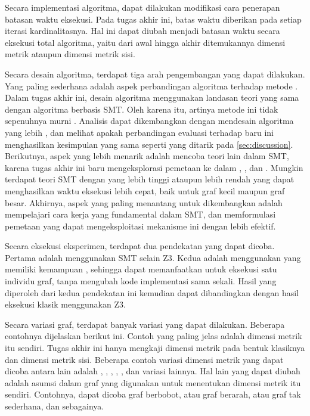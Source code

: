 Secara implementasi algoritma, dapat dilakukan modifikasi cara penerapan batasan waktu eksekusi. Pada tugas akhir ini, batas waktu diberikan pada setiap iterasi kardinalitasnya. Hal ini dapat diubah menjadi batasan waktu secara eksekusi total algoritma, yaitu dari awal hingga akhir ditemukannya dimensi metrik ataupun dimensi metrik sisi.

Secara desain algoritma, terdapat tiga arah pengembangan yang dapat dilakukan. Yang paling sederhana adalah aspek perbandingan algoritma terhadap metode . Dalam tugas akhir ini, desain algoritma  menggunakan landasan teori yang sama dengan algoritma berbasis SMT. Oleh karena itu, artinya metode ini tidak sepenuhnya murni . Analisis dapat dikembangkan dengan mendesain algoritma  yang lebih , dan melihat apakah perbandingan evaluasi terhadap  baru ini menghasilkan kesimpulan yang sama seperti yang ditarik pada \autoref{sec:discussion}. Berikutnya, aspek yang lebih menarik adalah mencoba teori lain dalam SMT, karena tugas akhir ini baru mengeksplorasi pemetaan  ke dalam , , dan . Mungkin terdapat teori SMT dengan  yang lebih tinggi ataupun lebih rendah yang dapat menghasilkan waktu eksekusi lebih cepat, baik untuk graf kecil maupun graf besar. Akhirnya, aspek yang paling menantang untuk dikembangkan adalah mempelajari cara kerja  yang fundamental dalam SMT, dan memformulasi pemetaan yang dapat mengeksploitasi mekanisme ini dengan lebih efektif.

Secara eksekusi eksperimen, terdapat dua pendekatan yang dapat dicoba. Pertama adalah menggunakan  SMT selain Z3. Kedua adalah menggunakan  yang memiliki kemampuan , sehingga dapat memanfaatkan  untuk eksekusi satu individu graf, tanpa mengubah kode implementasi sama sekali. Hasil yang diperoleh dari kedua pendekatan ini kemudian dapat dibandingkan dengan hasil eksekusi klasik menggunakan Z3.

Secara variasi graf, terdapat banyak variasi yang dapat dilakukan. Beberapa contohnya dijelaskan berikut ini. Contoh yang paling jelas adalah dimensi metrik itu sendiri. Tugas akhir ini hanya mengkaji dimensi metrik pada bentuk klasiknya dan dimensi metrik sisi. Beberapa contoh variasi dimensi metrik yang dapat dicoba antara lain adalah , , , , , dan variasi lainnya. Hal lain yang dapat diubah adalah asumsi dalam graf yang digunakan untuk menentukan dimensi metrik itu sendiri. Contohnya, dapat dicoba graf berbobot, atau graf berarah, atau graf tak sederhana, dan sebagainya.

